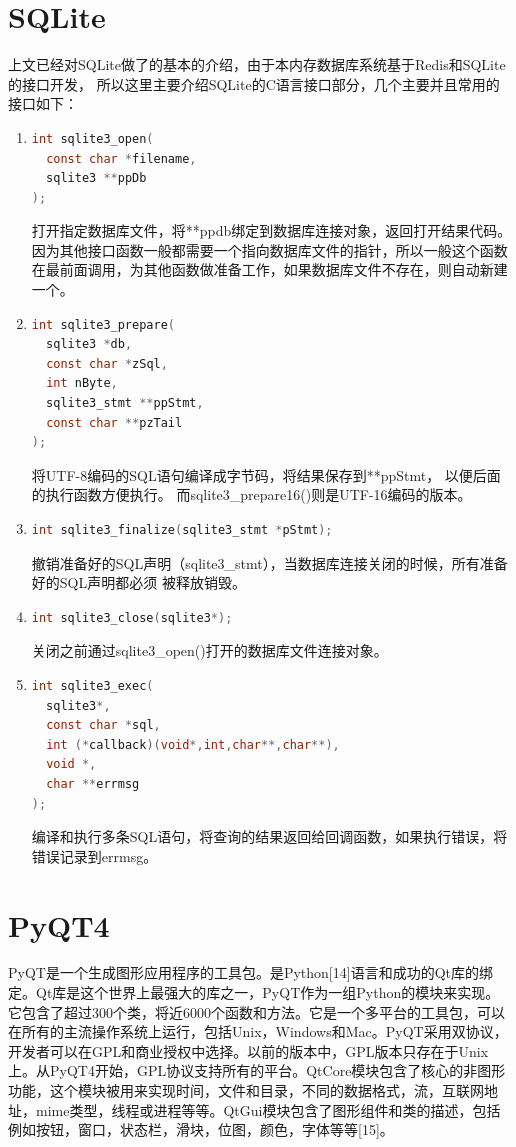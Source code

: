 \documentclass{zjutthesis}
\begin{document}
\section{SQLite}
上文已经对SQLite做了的基本的介绍，由于本内存数据库系统基于Redis和SQLite的接口开发， 所以这里主要介绍SQLite的C语言接口部分，几个主要并且常用的接口如下：
\begin{enumerate}[label=（\arabic*）]
\item{
\begin{lstlisting}[language=C]
int sqlite3_open(
  const char *filename,
  sqlite3 **ppDb
);
\end{lstlisting}
打开指定数据库文件，将**ppdb绑定到数据库连接对象，返回打开结果代码。因为其他接口函数一般都需要一个指向数据库文件的指针，所以一般这个函数在最前面调用，为其他函数做准备工作，如果数据库文件不存在，则自动新建一个。
}
\item{
\begin{lstlisting}[language=C]
int sqlite3_prepare(
  sqlite3 *db,
  const char *zSql,
  int nByte,
  sqlite3_stmt **ppStmt,
  const char **pzTail
);
\end{lstlisting}
将UTF-8编码的SQL语句编译成字节码，将结果保存到**ppStmt，
以便后面的执行函数方便执行。
而sqlite3\_prepare16()则是UTF-16编码的版本。
}
\item{
\begin{lstlisting}[language=C]
int sqlite3_finalize(sqlite3_stmt *pStmt);
\end{lstlisting}
撤销准备好的SQL声明（sqlite3\_stmt），当数据库连接关闭的时候，所有准备好的SQL声明都必须
被释放销毁。
}
\item{
\begin{lstlisting}[language=C]
int sqlite3_close(sqlite3*);
\end{lstlisting}
关闭之前通过sqlite3\_open()打开的数据库文件连接对象。
}
\item{
\begin{lstlisting}[language=C]
int sqlite3_exec(
  sqlite3*,
  const char *sql,
  int (*callback)(void*,int,char**,char**),
  void *,
  char **errmsg
);
\end{lstlisting}
编译和执行多条SQL语句，将查询的结果返回给回调函数，如果执行错误，将错误记录到errmsg。
}
\end{enumerate}

\section{PyQT4}
PyQT是一个生成图形应用程序的工具包。是Python[14]语言和成功的Qt库的绑定。Qt库是这个世界上最强大的库之一，PyQT作为一组Python的模块来实现。它包含了超过300个类，将近6000个函数和方法。它是一个多平台的工具包，可以在所有的主流操作系统上运行，包括Unix，Windows和Mac。PyQT采用双协议，开发者可以在GPL和商业授权中选择。以前的版本中，GPL版本只存在于Unix上。从PyQT4开始，GPL协议支持所有的平台。QtCore模块包含了核心的非图形功能，这个模块被用来实现时间，文件和目录，不同的数据格式，流，互联网地址，mime类型，线程或进程等等。QtGui模块包含了图形组件和类的描述，包括例如按钮，窗口，状态栏，滑块，位图，颜色，字体等等[15]。
\end{document}
